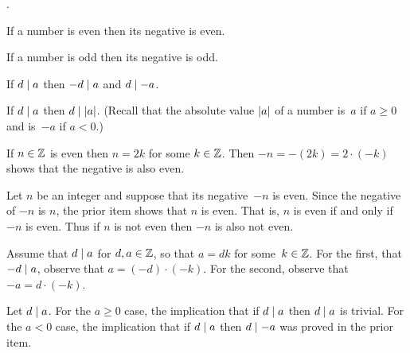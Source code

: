\documentclass{ibl}  %
\begin{document}
\begin{ex} 
\label{ex:InteractionOfParityWithSign}
\pord.
\begin{exes}
\item If a number is even then its negative is even.
\item If a number is odd then its negative is odd.
\item If $d\mid a$ then $-d\mid a$ and $d\mid -a$.
\item If $d\mid a$ then $d\mid\lvert a\rvert$.
  (Recall that the absolute value  $\lvert a\rvert$ of a number is~$a$ 
  if $a\geq 0$ and is~$-a$ if $a<0$.)

\end{exes}  
\begin{ans}
\begin{exes}
\item If $n\in\mathbb{Z}$ is even then $n=2k$ for some $k\in\mathbb{Z}$.
Then $-n=-(2k)=2\cdot(-k)$ shows that the negative is also even.
\item Let $n$ be an integer and suppose that its negative~$-n$ is even.
Since the negative of $-n$ is $n$, the prior item shows that $n$ is even.
That is, $n$ is even if and only if $-n$ is even.
Thus if $n$ is not even then $-n$ is also not even.
\item Assume that $d\mid a$ for $d,a\in\mathbb{Z}$, so that 
$a=dk$ for some~$k\in\mathbb{Z}$.
For the first, that $-d\mid a$, observe that
$a=(-d)\cdot(-k)$.
For the second, observe that $-a=d\cdot(-k)$.
\item Let $d\mid a$.
For the $a\geq 0$ case, the implication that if $d\mid a$ then $d\mid a$
is trivial.
For the $a<0$ case, 
the implication that if $d\mid a$ then $d\mid -a$ was
proved in the prior item.
\end{exes}
\end{ans}
\end{ex}
\end{document}
